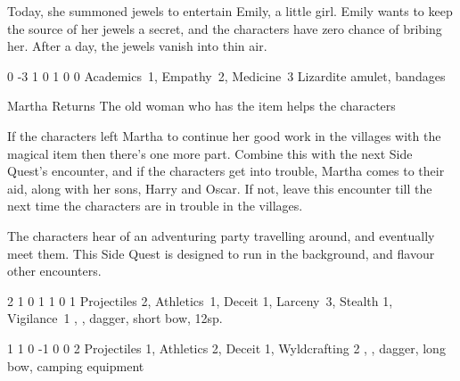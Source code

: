 \begin{multicols}{2}
Today, she summoned jewels to entertain Emily, a little girl.
Emily wants to keep the source of her jewels a secret, and the characters have zero chance of bribing her.
After a day, the jewels vanish into thin air.


	{0}%
	{-3}%
	{{1}%
	{0}%
	{1}}%
	{0}%
	{0}%
	{Academics~1, Empathy~2, Medicine~3}%
	{Lizardite amulet, bandages}%
	{}

{Martha Returns}%
{The old woman who has the item helps the characters}%

If the characters left Martha to continue her good work in the villages with the magical item then there's one more part.
Combine this with the next Side Quest's encounter, and if the characters get into trouble, Martha comes to their aid, along with her sons, Harry and Oscar.
If not, leave this encounter till the next time the characters are in trouble in the villages.



\stopcontents[sq]

\startcontents[Forest]
\resumecontents[Villages]
\stopcontents[Forest]
\stopcontents[Villages]

\startcontents[sq]

\sqminitoc

\noindent
The characters hear of an adventuring party travelling around, and eventually meet them.
This Side Quest is designed to run in the background, and flavour other encounters.

{2}%
{1}%
{{0}%
{1}%
{1}}%
{0}%
{1}%
{Projectiles 2, Athletics~1, Deceit 1, Larceny~3, Stealth 1, Vigilance~1\knacks{\precisestrike, \quickshot}}%
{\shortsword, \partialleather, dagger, short bow, 12sp.}%
{\addtocounter{fp}{5}}

{1}%
{1}%
{{0}%
{-1}%
{0}}%
{0}%
{2}%
{Projectiles 1, Athletics 2, Deceit 1, Wyldcrafting 2\knacks{\adrenalinesurge, \unstoppable, \finishingblow, \charge}}%
{\greatsword, \partialchain, dagger, long bow, camping equipment}%
{}


\end{multicols}
